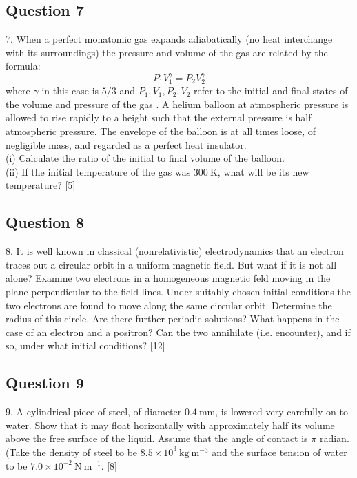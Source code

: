 \documentclass{article}
\begin{document}
\subsection{Question 7}
7. When a perfect monatomic gas expands adiabatically (no heat interchange with its surroundings) the pressure and volume of the gas are related by the formula:
$$
P_{1} V_{1}^{\gamma}=P_{2} V_{2}^{\gamma}
$$
where $\gamma$ in this case is $5 / 3$ and $P_{1}, V_{1}, P_{2}, V_{2}$ refer to the initial and final states of the volume and pressure of the gas . A helium balloon at atmospheric pressure is allowed to rise rapidly to a height such that the external pressure is half atmospheric pressure. The envelope of the balloon is at all times loose, of negligible mass, and regarded as a perfect heat insulator. \\
(i) Calculate the ratio of the initial to final volume of the balloon. \\
(ii) If the initial temperature of the gas was $300 \mathrm{~K}$, what will be its new temperature? [5] 

\subsection{Question 8}
8. It is well known in classical (nonrelativistic) electrodynamics that an electron traces out a circular orbit in a uniform magnetic field. But what if it is not all alone? Examine two electrons in a homogeneous magnetic feld moving in the plane perpendicular to the field lines. Under suitably chosen initial conditions the two electrons are found to move along the same circular orbit. Determine the radius of this circle. Are there further periodic solutions? What happens in the case of an electron and a positron? Can the two annihilate (i.e. encounter), and if so, under what initial conditions? [12]

\subsection{Question 9}
9. A cylindrical piece of steel, of diameter $0.4 \mathrm{~mm}$, is lowered very carefully on to water. Show that it may float horizontally with approximately half its volume above the free surface of the liquid. Assume that the angle of contact is $\pi$ radian. (Take the density of steel to be $8.5 \times 10^{3} \mathrm{~kg} \mathrm{~m}^{-3}$ and the surface tension of water to be $7.0 \times 10^{-2} \mathrm{~N} \mathrm{~m}^{-1}$. [8]
\end{document}
